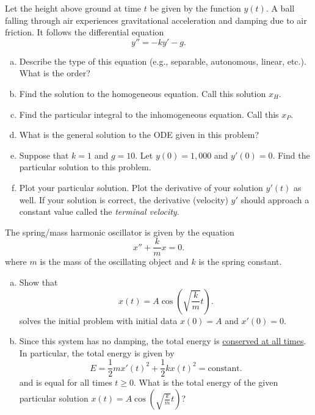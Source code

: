 \begin{problem}
Let the height above ground at time $t$ be given by the function $y(t)$. A ball falling through air experiences gravitational acceleration and damping due to air friction. It follows the differential equation
\[
y'' = -ky' - g.
\]
\begin{enumerate}[(a)]
    \item Describe the type of this equation (e.g., separable, autonomous, linear, etc.). What is the order?
    \item Find the solution to the homogeneous equation. Call this solution $x_H$.
    \item Find the particular integral to the inhomogeneous equation. Call this $x_P$.
    \item What is the general solution to the ODE given in this problem?
    \item Suppose that $k=1$ and $g=10$. Let $y(0)=1,000$ and $y'(0)=0$. Find the particular solution to this problem.
    \item Plot your particular solution. Plot the derivative of your solution $y'(t)$ as well. If your solution is correct, the derivative (velocity) $y'$ should approach a constant value called the \emph{terminal velocity}.
\end{enumerate}
\end{problem}

\begin{problem}
The spring/mass harmonic oscillator is given by the equation
\[
x''+ \frac{k}{m}x = 0.
\]
where $m$ is the mass of the oscillating object and $k$ is the spring constant.
\begin{enumerate}[(a)]
    \item Show that
    \[
    x(t)=A \cos\left(\sqrt{\frac{k}{m}}t\right).
    \]
    solves the initial problem with initial data $x(0)=A$ and $x'(0)=0$.
    \vspace*{6cm}
    \item Since this system has no damping, the total energy is \underline{conserved at all times}.  In particular, the total energy is given by
    \[
    E=\frac{1}{2}mx'(t)^2+\frac{1}{2}kx(t)^2 = \textrm{constant}.
    \]
    and is equal for all times $t\geq 0$. What is the total energy of the given particular solution $x(t)=A\cos\left(\sqrt{\frac{k}{m}}t\right)$?
    \vspace*{5cm}

\end{enumerate}
\end{problem}

